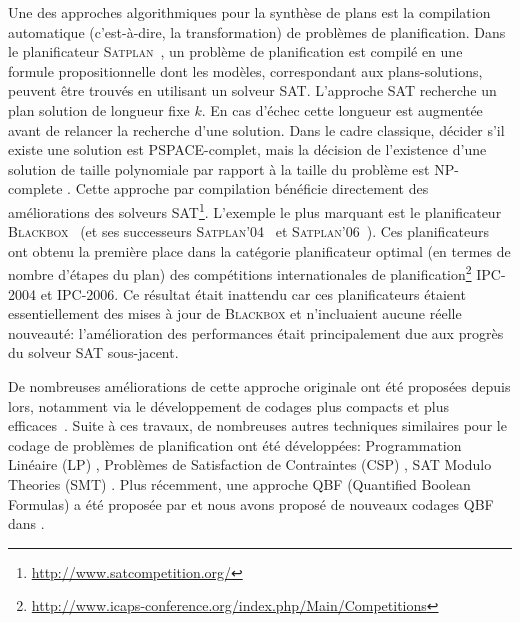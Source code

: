 Une des approches algorithmiques pour la synthèse de plans est la compilation automatique (c'est-à-dire, la transformation) de problèmes de planification. Dans le planificateur \textsc{Satplan}~\cite{KS92}, un problème de planification est compilé en une formule propositionnelle dont les modèles, correspondant aux plans-solutions, peuvent être trouvés en utilisant un solveur SAT.
L'approche SAT recherche un plan solution de longueur fixe $k$. En cas d'échec cette longueur est augmentée avant de relancer la recherche d'une solution. Dans le cadre classique, décider s'il existe une solution est PSPACE-complet, mais la décision de l'existence d'une solution de taille polynomiale par rapport à la taille du problème est NP-complete \cite{DBLP:journals/ai/Bylander94}.
Cette approche par compilation bénéficie directement des améliorations des solveurs SAT\footnote{\url{http://www.satcompetition.org/}}. L'exemple le plus marquant est le planificateur \textsc{Blackbox}~\cite{KS98a,KS99} (et ses successeurs \textsc{Satplan}'04~\cite{KAU04} et \textsc{Satplan}'06~\cite{KSH06}). Ces planificateurs ont obtenu la première place dans la catégorie planificateur optimal (en termes de nombre d'étapes du plan) des compétitions internationales de planification\footnote{\url{http://www.icaps-conference.org/index.php/Main/Competitions}} IPC-2004 et IPC-2006. Ce résultat était inattendu car ces planificateurs étaient essentiellement des mises à jour de \textsc{Blackbox} et n'incluaient aucune réelle nouveauté: l'amélioration des performances était principalement due aux progrès du solveur SAT sous-jacent.



De nombreuses améliorations de cette approche originale ont été proposées depuis lors, notamment via le développement de codages plus compacts et plus efficaces~\cite{KS96,EMW97,MK98a,MK99,RIN03,RHN04,RHN06,DBLP:conf/aips/2008}. %
Suite à ces travaux, de nombreuses autres techniques similaires pour le codage de problèmes de planification ont été développées: Programmation Linéaire (LP) \cite{DBLP:conf/ijcai/WolfmanW99}, Problèmes de Satisfaction de Contraintes (CSP) \cite{DBLP:journals/ai/DoK01}, SAT Modulo Theories (SMT) \cite{DBLP:journals/ai/ShinD05,DBLP:conf/ictai/MarisR08,DBLP:conf/aaai/Rintanen15}. Plus récemment, une approche QBF (Quantified Boolean Formulas) a été proposée par \cite{DBLP:conf/aaai/Rintanen07,DBLP:conf/ecai/CashmoreFG12} et nous avons proposé de nouveaux codages QBF dans \cite{GasquetLMRV18}.

